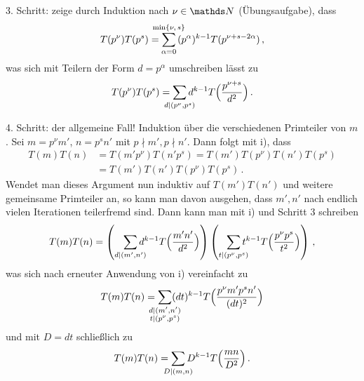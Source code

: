 \begin{bewe}
	3. Schritt: zeige durch Induktion nach $\nu \in \NN$ (Übungsaufgabe), dass 
	\[
	T(p^\nu) T(p^s) = \smashoperator{\sum_{\alpha = 0}^{\min \{\nu,\,s\}}} \, (p^\alpha)^{k-1} T(p^{\nu + s - 2\alpha})
	\,,
	\]
	was sich mit Teilern der Form $d = p^\alpha$ umschreiben lässt zu
	\[
	T(p^\nu) T(p^s) = \smashoperator{\sum_{d \vert (p^\nu, p^s)}} d^{k-1} T\Bigl(\frac{p^{\nu + s}}{d^2}\Bigr)
	\,.
	\]
	
	4. Schritt: der allgemeine Fall! Induktion über die verschiedenen Primteiler von $m$. Sei $m = p^\nu m'$, $n = p^s n'$ mit $p \nmid m', p \nmid n'$. Dann folgt mit i), dass
	\begin{align*}
	T(m)T(n)
	&= T(m'p^\nu) T(n'p^s)
	= T(m')T(p^\nu)T(n')T(p^s) \\
	&= T(m')T(n') T(p^\nu) T(p^s)
	\,.
	\end{align*}
	Wendet man dieses Argument nun induktiv auf $T(m')T(n')$ und weitere gemeinsame Primteiler an, so kann man davon ausgehen, dass $m', n'$ nach endlich vielen Iterationen teilerfremd sind. Dann kann man mit i) und Schritt 3 schreiben
	\[
	T(m)T(n) = \left(\smashoperator[r]{\sum_{d \vert (m',n')}} d^{k-1} T\Bigl(\frac {m'n'}{d^2}\Bigr)\right) \left(\smashoperator[r]{\sum_{t \vert (p^\nu, p^s)}} t^{k-1} T\Bigl(\frac{p^\nu p^s}{t^2}\Bigr) \right)
	\,,
	\]
	was sich nach erneuter Anwendung von i) vereinfacht zu
	\[
	T(m)T(n) = \smashoperator{\sum_{\substack{d \vert (m',n')\\t \vert (p^\nu, p^s)}}} (dt)^{k-1} T\Bigl(\frac {p^\nu m'p^s n'}{(dt)^2}\Bigr)
	\]
	und mit $D = dt$ schließlich zu
	\[
	T(m)T(n) = \smashoperator{\sum_{D \vert (m,n)}} D^{k-1} T\Bigl(\frac {mn}{D^2}\Bigr)
	\,.
	\]
\end{bewe}
